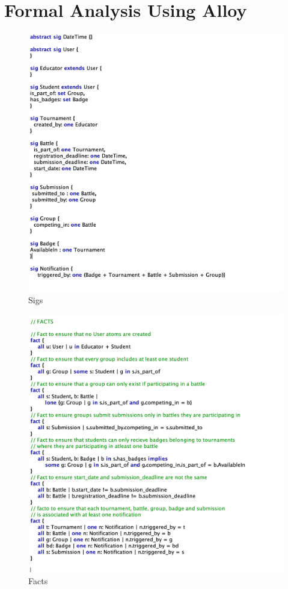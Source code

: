 \clearpage
\newpage
\section{Formal Analysis Using Alloy}
\label{sec:Alloy}


\begin{figure}[htbp!]
    \centering
    \includegraphics[width=\textwidth]{Graphics/Alloy/Sigs.png}
    \caption{Sigs}
    \label{fig:sigs}
\end{figure}

\begin{figure}[htbp!]
    \centering
    \includegraphics[width=\textwidth]{Graphics/Alloy/Facts.png}
    \caption{Facts}
    \label{fig:Facts}
\end{figure}


